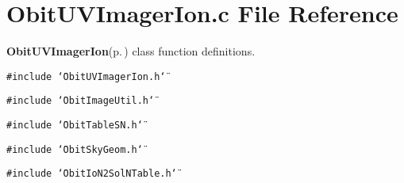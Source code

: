 \section{Obit\-UVImager\-Ion.c File Reference}
\label{ObitUVImagerIon_8c}
{\bf Obit\-UVImager\-Ion}{\rm (p.\,\pageref{structObitUVImagerIon})} class function definitions. 

{\tt \#include \char`\"{}Obit\-UVImager\-Ion.h\char`\"{}}\par
{\tt \#include \char`\"{}Obit\-Image\-Util.h\char`\"{}}\par
{\tt \#include \char`\"{}Obit\-Table\-SN.h\char`\"{}}\par
{\tt \#include \char`\"{}Obit\-Sky\-Geom.h\char`\"{}}\par
{\tt \#include \char`\"{}Obit\-Io\-N2Sol\-NTable.h\char`\"{}}\par
